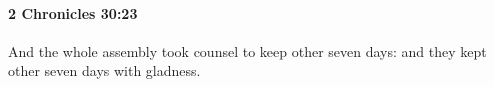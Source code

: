 
		\paragraph{2 Chronicles 30:23} %
			\label{2CHRONICLES-30-23}

			And the whole assembly took counsel to keep other seven days: and they kept other seven days with gladness.


